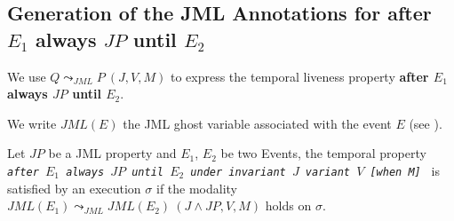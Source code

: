 









\subsection{Generation of the JML Annotations for \textbf{after $E_1$ always $JP$ until $E_2$}}

We  use $Q\leadsto_{JML}P ~(J,V,M)$ to express the temporal liveness property \textbf{after $E_1$ always $JP$ until $E_2$}. 

We write $JML(E)$ the JML ghost variable associated with the event $E$ (see \cite{Huis02}).


\begin{proposition} \label{prop-after} Let $JP$ be a JML property  and $E_1$, $E_2$ be two Events, the temporal property \emph{\texttt{after $E_1$ always $JP$ until $E_2$ under invariant $J$ variant $V$ [when M] }} is satisfied by an execution $\sigma$ if the modality $JML(E_1) \leadsto_{JML} JML(E_2) ~(J \wedge JP,V,M)$ holds on $\sigma$.
\end{proposition}

